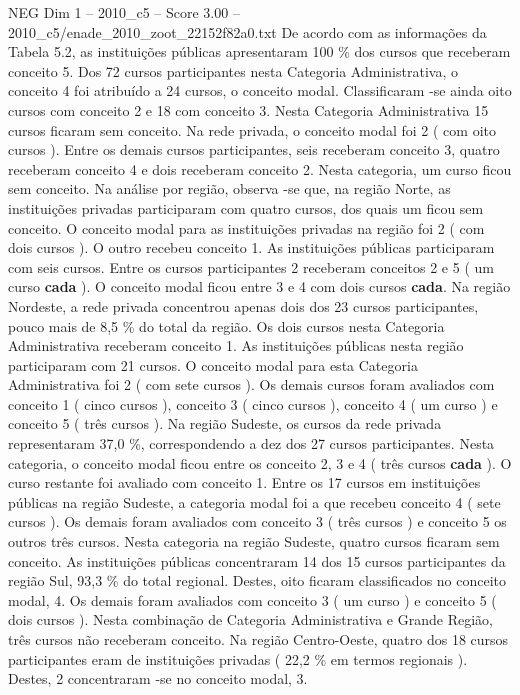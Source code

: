 \begin{textsample}{NEG Dim 1 – 2010\_c5 – Score 3.00 – 2010\_c5/enade\_2010\_zoot\_22152f82a0.txt}
De acordo com as informações da Tabela 5.2, as instituições públicas apresentaram 100 \% dos cursos que receberam conceito 5.
Dos 72 cursos participantes nesta Categoria Administrativa, o conceito 4 foi atribuído a 24 cursos, o conceito modal.
Classificaram -se ainda oito cursos com conceito 2 e 18 com conceito 3.
Nesta Categoria Administrativa 15 cursos ficaram sem conceito.
Na rede privada, o conceito modal foi 2 ( com oito cursos ).
Entre os demais cursos participantes, seis receberam conceito 3, quatro receberam conceito 4 e dois receberam conceito 2.
Nesta categoria, um curso ficou sem conceito.
Na análise por região, observa -se que, na região Norte, as instituições privadas participaram com quatro cursos, dos quais um ficou sem conceito.
O conceito modal para as instituições privadas na região foi 2 ( com dois cursos ).
O outro recebeu conceito 1.
As instituições públicas participaram com seis cursos.
Entre os cursos participantes 2 receberam conceitos 2 e 5 ( um curso \textbf{cada} ).
O conceito modal ficou entre 3 e 4 com dois cursos \textbf{cada}.
Na região Nordeste, a rede privada concentrou apenas dois dos 23 cursos participantes, pouco mais de 8,5 \% do total da região.
Os dois cursos nesta Categoria Administrativa receberam conceito 1.
As instituições públicas nesta região participaram com 21 cursos.
O conceito modal para esta Categoria Administrativa foi 2 ( com sete cursos ).
Os demais cursos foram avaliados com conceito 1 ( cinco cursos ), conceito 3 ( cinco cursos ), conceito 4 ( um curso ) e conceito 5 ( três cursos ).
Na região Sudeste, os cursos da rede privada representaram 37,0 \%, correspondendo a dez dos 27 cursos participantes.
Nesta categoria, o conceito modal ficou entre os conceito 2, 3 e 4 ( três cursos \textbf{cada} ).
O curso restante foi avaliado com conceito 1.
Entre os 17 cursos em instituições públicas na região Sudeste, a categoria modal foi a que recebeu conceito 4 ( sete cursos ).
Os demais foram avaliados com conceito 3 ( três cursos ) e conceito 5 os outros três cursos.
Nesta categoria na região Sudeste, quatro cursos ficaram sem conceito.
As instituições públicas concentraram 14 dos 15 cursos participantes da região Sul, 93,3 \% do total regional.
Destes, oito ficaram classificados no conceito modal, 4.
Os demais foram avaliados com conceito 3 ( um curso ) e conceito 5 ( dois cursos ).
Nesta combinação de Categoria Administrativa e Grande Região, três cursos não receberam conceito.
Na região Centro-Oeste, quatro dos 18 cursos participantes eram de instituições privadas ( 22,2 \% em termos regionais ).
Destes, 2 concentraram -se no conceito modal, 3.

\end{textsample}
